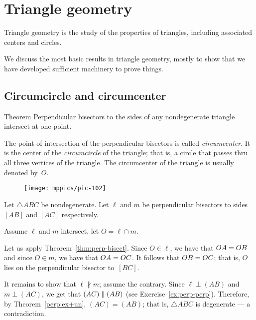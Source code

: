 \chapter{Triangle geometry}\label{chap:triangle}

Triangle geometry is the study of the properties of triangles, including associated centers and circles.

We discuss the most basic results in triangle geometry, 
mostly to show that we have developed sufficient machinery to prove things.

\section*{Circumcircle and circumcenter}

\begin{thm}{Theorem}\label{thm:circumcenter}
Perpendicular bisectors to the sides of any nondegenerate triangle intersect at one point.
\end{thm}

The point of intersection of the perpendicular bisectors is called \emph{circumcenter}.
It is the center of the \emph{circumcircle} of the triangle;
that is, a circle that passes thru all three vertices of the triangle.
The circumcenter of the triangle is usually denoted by~$O$.

\begin{wrapfigure}{o}{28mm}
\centering
\texttt{[image: mppics/pic-102]}
\end{wrapfigure}


Let $\triangle ABC$ be nondegenerate.
Let $\ell$ and $m$ be perpendicular bisectors to sides $[AB]$ and $[AC]$ respectively.

Assume $\ell$ and $m$ intersect,
let $O=\ell\cap m$.

Let us apply Theorem~\ref{thm:perp-bisect}.
Since $O\in\ell$, we have that $OA\z=OB$ and since $O\in m$, we have that $OA\z=OC$.
It follows that $OB\z=OC$;
that is, $O$ lies on the perpendicular bisector to~$[B C]$.

It remains to show that $\ell\nparallel m$;
assume the contrary.
Since
$\ell\perp(AB)$ and $m\perp (AC)$, we get that $(AC)\z\parallel (AB)$ 
(see Exercise~\ref{ex:perp-perp}).
Therefore, by Theorem~\ref{perp:ex+un}, $(AC)=(AB)$;
that is, $\triangle ABC$ is degenerate --- a contradiction.
\qeds

